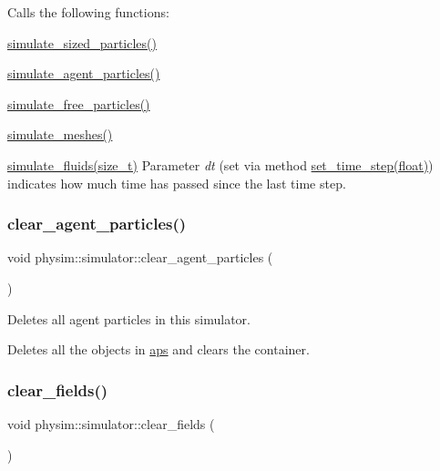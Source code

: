 Calls the following functions\+:
\begin{DoxyItemize}
\item \hyperlink{classphysim_1_1simulator_ac99a02f99b4f83501478093d402abea5}{simulate\+\_\+sized\+\_\+particles()}
\item \hyperlink{classphysim_1_1simulator_a99dbf5870ec5383266f87e60c1686049}{simulate\+\_\+agent\+\_\+particles()}
\item \hyperlink{classphysim_1_1simulator_ac836fc5c8ccf186b8030da54586a8b07}{simulate\+\_\+free\+\_\+particles()}
\item \hyperlink{classphysim_1_1simulator_aea4165314f9285dfc3b64ba9a2666aaf}{simulate\+\_\+meshes()}
\item \hyperlink{classphysim_1_1simulator_acb3359c9faedfc69191bf9a4618eebfa}{simulate\+\_\+fluids(size\+\_\+t)} Parameter {\itshape dt} (set via method \hyperlink{classphysim_1_1simulator_ab86bf6d22fd222a299183c9d82a71bc1}{set\+\_\+time\+\_\+step(float)}) indicates how much time has passed since the last time step. 
\end{DoxyItemize}\mbox{\label{classphysim_1_1simulator_a903bf3d4f155e8e524d4031b24042142}} 
\subsubsection{\texorpdfstring{clear\+\_\+agent\+\_\+particles()}{clear\_agent\_particles()}}
{\footnotesize\ttfamily void physim\+::simulator\+::clear\+\_\+agent\+\_\+particles (\begin{DoxyParamCaption}{ }\end{DoxyParamCaption})}



Deletes all agent particles in this simulator. 

Deletes all the objects in \hyperlink{classphysim_1_1simulator_a838f036ef9d378d1e3f5207c3f031b52}{aps} and clears the container. \mbox{\label{classphysim_1_1simulator_afe53c23ae11f78166576ad44f56ee953}} 
\subsubsection{\texorpdfstring{clear\+\_\+fields()}{clear\_fields()}}
{\footnotesize\ttfamily void physim\+::simulator\+::clear\+\_\+fields (\begin{DoxyParamCaption}{ }\end{DoxyParamCaption})}



